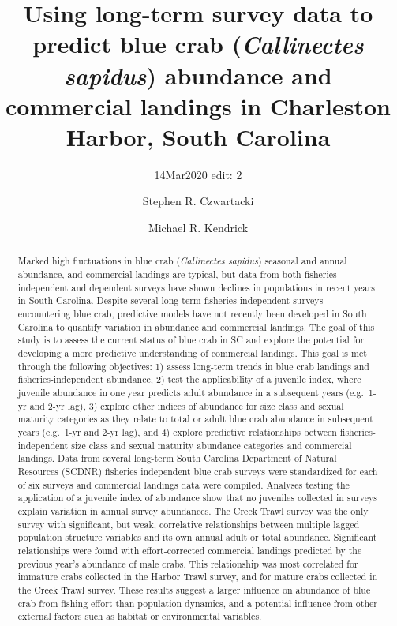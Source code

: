 \documentclass[
]{article}
\title{Using long-term survey data to predict blue crab (\emph{Callinectes
sapidus}) abundance and commercial landings in Charleston Harbor, South
Carolina}
\subtitle{14Mar2020 edit: 2}
\author{Stephen R. Czwartacki \and Michael R. Kendrick}
\date{}
\begin{document}
\maketitle
\begin{abstract}
Marked high fluctuations in blue crab (\emph{Callinectes sapidus})
seasonal and annual abundance, and commercial landings are typical, but
data from both fisheries independent and dependent surveys have shown
declines in populations in recent years in South Carolina. Despite
several long-term fisheries independent surveys encountering blue crab,
predictive models have not recently been developed in South Carolina to
quantify variation in abundance and commercial landings. The goal of
this study is to assess the current status of blue crab in SC and
explore the potential for developing a more predictive understanding of
commercial landings. This goal is met through the following objectives:
1) assess long-term trends in blue crab landings and
fisheries-independent abundance, 2) test the applicability of a juvenile
index, where juvenile abundance in one year predicts adult abundance in
a subsequent years (e.g.~1-yr and 2-yr lag), 3) explore other indices of
abundance for size class and sexual maturity categories as they relate
to total or adult blue crab abundance in subsequent years (e.g.~1-yr and
2-yr lag), and 4) explore predictive relationships between
fisheries-independent size class and sexual maturity abundance
categories and commercial landings. Data from several long-term South
Carolina Department of Natural Resources (SCDNR) fisheries independent
blue crab surveys were standardized for each of six surveys and
commercial landings data were compiled. Analyses testing the application
of a juvenile index of abundance show that no juveniles collected in
surveys explain variation in annual survey abundances. The Creek Trawl
survey was the only survey with significant, but weak, correlative
relationships between multiple lagged population structure variables and
its own annual adult or total abundance. Significant relationships were
found with effort-corrected commercial landings predicted by the
previous year's abundance of male crabs. This relationship was most
correlated for immature crabs collected in the Harbor Trawl survey, and
for mature crabs collected in the Creek Trawl survey. These results
suggest a larger influence on abundance of blue crab from fishing effort
than population dynamics, and a potential influence from other external
factors such as habitat or environmental variables.
\end{abstract}
\end{document}
